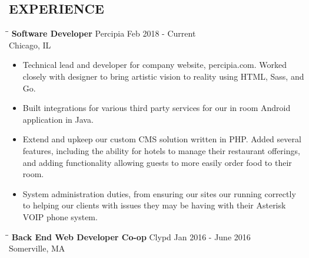 \documentclass{res}
\begin{document}
 

\address{\bf  1611 W. Division st. Apt 1106 \\Chicago, IL 60622 \\(857) 407-8840 \\ ronbrz@protonmail.ch}

\begin{resume}
\section{EXPERIENCE}
\vspace{0in}
\begin{tabbing}
  \hspace{2.3in}\= \hspace{2.6in}\= \kill %
  {\bf Software Developer} \>Percipia     \> Feb 2018 - Current\\
  \>Chicago, IL
\end{tabbing}
\begin{itemize} \itemsep -2pt
\item Technical lead and developer for company website, percipia.com. Worked closely
  with designer to bring artistic vision to reality using HTML, Sass, and Go.
\item Built integrations for various third party services for our in room Android application in Java.
\item Extend and upkeep our custom CMS solution written in PHP. Added several features, including
  the ability for hotels to manage their restaurant offerings, and adding functionality allowing guests to
  more easily order food to their room.
\item System administration duties, from ensuring our sites our running correctly to helping our clients
  with issues they may be having with their Asterisk VOIP phone system.
\end{itemize}
\vspace{-.2in}
\begin{tabbing}
  \hspace{2.3in}\= \hspace{2.6in}\= \kill %
  {\bf Back End Web Developer Co-op} \>Clypd     \> Jan 2016 - June 2016\\
  \>Somerville, MA
\end{tabbing}
\begin{itemize} \itemsep -2pt

\end{itemize}
\end{resume}
\end{document}
